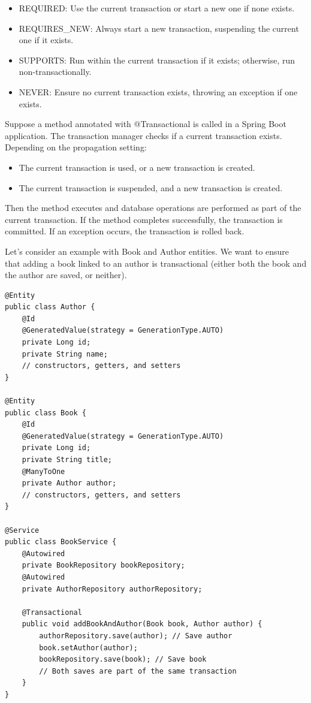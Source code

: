 \begin{itemize}
\item REQUIRED: Use the current transaction or start a new one if none exists.
\item REQUIRES\_NEW: Always start a new transaction, suspending the current one if it exists.
\item SUPPORTS: Run within the current transaction if it exists; otherwise, run non-transactionally.
\item NEVER: Ensure no current transaction exists, throwing an exception if one exists.
\end{itemize}


Suppose a method annotated with @Transactional is called in a Spring Boot application. The transaction manager checks if a current transaction exists. Depending on the propagation setting:
\begin{itemize}
\item The current transaction is used, or a new transaction is created.
\item The current transaction is suspended, and a new transaction is created.
\end{itemize}
Then the method executes and database operations are performed as part of the current transaction.
If the method completes successfully, the transaction is committed.
If an exception occurs, the transaction is rolled back.

Let’s consider an example with Book and Author entities. We want to ensure that adding a book linked to an author is transactional (either both the book and the author are saved, or neither).

\begin{lstlisting}
@Entity
public class Author {
    @Id
    @GeneratedValue(strategy = GenerationType.AUTO)
    private Long id;
    private String name;
    // constructors, getters, and setters
}

@Entity
public class Book {
    @Id
    @GeneratedValue(strategy = GenerationType.AUTO)
    private Long id;
    private String title;
    @ManyToOne
    private Author author;
    // constructors, getters, and setters
}

@Service
public class BookService {
    @Autowired
    private BookRepository bookRepository;
    @Autowired
    private AuthorRepository authorRepository;

    @Transactional
    public void addBookAndAuthor(Book book, Author author) {
        authorRepository.save(author); // Save author
        book.setAuthor(author);
        bookRepository.save(book); // Save book
        // Both saves are part of the same transaction
    }
}
\end{lstlisting}

